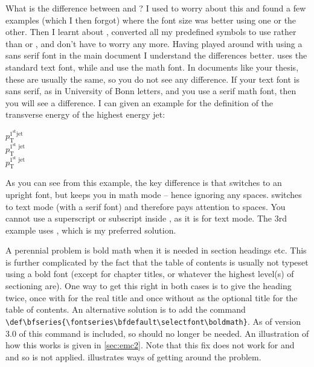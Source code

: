 What is the difference between  and
? I used to worry about this and found a
few examples (which I then forgot) where the font size was better
using one or the other. Then I learnt about ,
converted all my predefined symbols to use  rather than
 or , and don't have to worry any
more.
Having played around with using a sans serif font in the main document I understand the differences better.
 uses the standard text font,
while  and  use the math font.
In documents like your thesis, these are usually the same,
so you do not see any difference.
If your text font is sans serif, as in University of Bonn letters,
and you use a serif math font, then you will see a difference.
I can given an example for the definition
of the transverse energy of the highest energy jet:
\begin{tcblisting}{}
\(p_{\mathrm{T}}^{\mathrm{1^{\text{st}} jet}}\)\\
\(p_{\textrm{T}}^{\textrm{1}^{\text{st}}\textrm{ jet}}\)\\
\(p_{\text{T}}^{1^{\text{st}}\text{ jet}}\)
\end{tcblisting}
As you can see
from this example, the key difference is that  switches
to an upright font, but keeps you in math mode -- hence ignoring any
spaces.
 switches to text mode (with a serif font) and
therefore pays attention to spaces.
You cannot use a superscript or subscript inside ,
as it is for text mode.
The 3rd example uses , which is my preferred solution.

A perennial problem is bold math when it is needed in
section headings etc. This is further complicated by the fact that the
table of contents is usually not typeset using a bold font (except for
chapter titles, or whatever the highest level(s) of sectioning are). %
One way to get this right in both cases is to give the
heading twice, once with  for the real title and once
without as the optional title for the table of contents.
An alternative solution is to add the command\\
\verb|\def\bfseries{\fontseries\bfdefault\selectfont\boldmath}|.
As of version 3.0 of  this command is included,
so  should no longer be needed.
An illustration of how this works is given in \cref{sec:emc2}.
Note that this fix does not work for \LuaLaTeX and \XeLaTeX and so is not applied.
 illustrates ways of getting around the problem.

